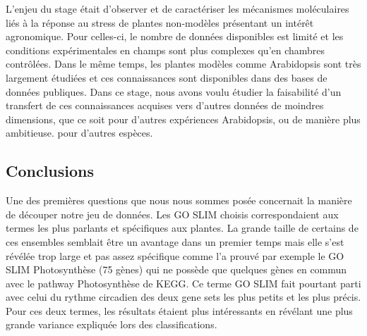 \documentclass[twoside]{article}
\newcommand{\AR}[1]{\textcolor{black}{#1}}
\begin{document}

L'enjeu du stage était d'observer et de caractériser les mécanismes moléculaires liés à la réponse au stress de plantes non-modèles présentant un intérêt agronomique. Pour celles-ci, le nombre de données disponibles est limité et les conditions expérimentales en champs sont plus complexes qu'en chambres contrôlées. Dans le même temps, les plantes modèles comme Arabidopsis sont très largement étudiées et ces connaissances sont disponibles dans des bases de données publiques. Dans ce stage, nous avons voulu étudier la faisabilité d'un transfert de ces connaissances acquises vers d'autres données de moindres dimensions, que ce soit pour d'autres expériences Arabidopsis, ou de manière plus ambitieuse. pour d'autres espèces.


\subsection{Conclusions}

\vspace{0.5cm}Une des premières questions que nous nous sommes posée concernait la manière de découper notre jeu de données. Les GO SLIM choisis correspondaient aux termes les plus parlants et spécifiques aux plantes. La grande taille de certains de ces ensembles semblait être un avantage dans un premier temps mais elle s'est révélée trop large et pas assez spécifique comme l'a prouvé par exemple le GO SLIM Photosynthèse (75 gènes) qui ne possède que quelques gènes en commun avec le pathway Photosynthèse de KEGG. Ce terme GO SLIM fait pourtant parti avec celui du rythme circadien des deux gene sets les plus petits et les plus précis. Pour ces deux termes, les résultats étaient plus intéressants en révélant une plus grande variance expliquée lors des classifications.
\end{document}
